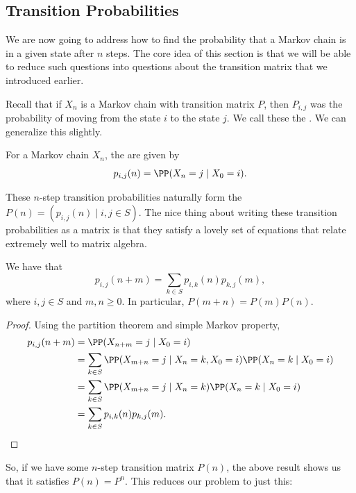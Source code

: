 \documentclass[a4paper]{scrartcl}
\begin{document}
\subsection{Transition Probabilities}

We are now going to address how to find the probability that a Markov chain is in a given state after $n$ steps.
The core idea of this section is that we will be able to reduce such questions into questions about the transition matrix that we introduced earlier.

Recall that if $X_n$ is a Markov chain with transition matrix $P$, then $P_{i, j}$ was the probability of moving from the state $i$ to the state $j$. We call these the . We can generalize this slightly.

\begin{definition}
	For a Markov chain $X_n$, the  are given by
	$$
	p_{i, j}(n) = \PP(X_n = j \mid X_0 = i).
	$$
\end{definition}

These $n$-step transition probabilities naturally form the  $P(n) = (p_{i, j}(n) \mid i, j \in S)$. The nice thing about writing these transition probabilities as a matrix is that they satisfy a lovely set of equations that relate extremely well to matrix algebra.

\begin{theorem}
	We have that
	$$
	p_{i, j}(n + m) = \sum_{k \in S} p_{i, k}(n)p_{k, j}(m),
	$$
	where $i, j \in S$ and $m, n \geq 0$. In particular, $P(m + n) = P(m)P(n)$.
\end{theorem}
\begin{proof}
	Using the partition theorem and simple Markov property,
	\begin{align*}
		p_{i, j}(n + m) &= \PP(X_{n + m} = j \mid X_0 = i) \\
		&= \sum_{k \in S} \PP(X_{m + n} = j \mid X_n = k, X_0 = i) \PP(X_n = k \mid X_0 = i) \\
		&= \sum_{k \in S} \PP(X_{m + n} = j \mid X_n = k) \PP(X_n = k \mid X_0 = i) \\
		&= \sum_{k \in S} p_{i, k}(n) p_{k, j}(m).
	\end{align*}
\end{proof}

So, if we have some $n$-step transition matrix $P(n)$, the above result shows us that it satisfies $P(n) = P^n$. This reduces our problem to just this:
\end{document}
